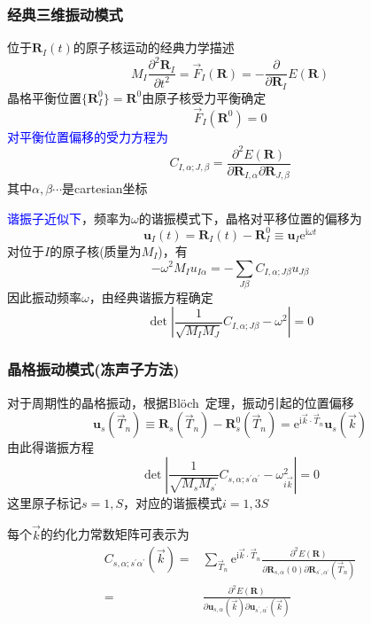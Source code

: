 \frame
{
	\frametitle{经典三维振动模式}
			位于$\mathbf{R}_I(t)$的原子核运动的经典力学描述
			\begin{displaymath}
				M_I\frac{\partial^2\mathbf{R}_I}{\partial t^2}=\vec F_I(\mathbf{R})=-\frac{\partial}{\partial\mathbf{R}_I}E(\mathbf{R})
			\end{displaymath}
			晶格平衡位置$\{\mathbf{R}_I^0\}=\mathbf R^0$由原子核受力平衡确定
			\begin{displaymath}
				\vec F_I(\mathbf R^0)=0
			\end{displaymath}
			\textcolor{blue}{对平衡位置偏移的受力方程为}
			\begin{displaymath}
				C_{I,\alpha;J,\beta}=\frac{\partial^2E(\mathbf{R})}{\partial\mathbf{R}_{I,\alpha}\partial\mathbf{R}_{J,\beta}}
			\end{displaymath}
			其中$\alpha,\beta\cdots$是\textrm{cartesian}坐标

			\textcolor{blue}{谐振子近似下}，频率为$\omega$的谐振模式下，晶格对平移位置的偏移为
			\begin{displaymath}
				\mathbf{u}_I(t)=\mathbf{R}_I(t)-\mathbf{R}_I^0\equiv\mathbf{u}_I\mathrm{e}^{\mathrm{i}\omega t}
			\end{displaymath}
			对位于$I$的原子核(质量为$M_I$)，有
			\begin{displaymath}
				-\omega^2M_Iu_{I\alpha}=-\sum_{J\beta}C_{I,\alpha;J\beta}u_{J\beta}
			\end{displaymath}
			因此振动频率$\omega$，由经典谐振方程确定
			\begin{displaymath}
				\det\left|\frac1{\sqrt{M_IM_J}}C_{I,\alpha;J\beta}-\omega^2\right|=0
			\end{displaymath}
}

\frame
{
	\frametitle{晶格振动模式(冻声子方法)}
	对于周期性的晶格振动，根据\textrm{Bl\"och~}定理，振动引起的位置偏移
			\begin{displaymath}
				\mathbf{u}_s(\vec T_n)\equiv\mathbf{R}_s(\vec T_n)-\mathbf{R}_s^0(\vec T_n)=\mathrm{e}^{\mathrm{i}\vec k\cdot\vec T_n}\mathbf{u}_s(\vec k)
			\end{displaymath}
			由此得谐振方程
			\begin{displaymath}
				\det\left|\frac1{\sqrt{M_sM_{s^{\prime}}}}C_{s,\alpha;s^{\prime}\alpha^{\prime}}-\omega_{i\vec k}^2\right|=0
			\end{displaymath}
			这里原子标记$s=1,S$，对应的谐振模式$i=1,3S$

			每个$\vec k$的约化力常数矩阵可表示为
			\begin{displaymath}
				\begin{aligned}
				C_{s,\alpha;s^{\prime}\alpha^{\prime}}(\vec k)=&\sum_{\vec T_n}\mathrm{e}^{\mathrm{i}\vec k\cdot\vec T_n}\frac{\partial^2 E(\mathbf{R})}{\partial\mathbf{R}_{s,\alpha}(0)\partial\mathbf{R}_{s^{\prime},\alpha^{\prime}}(\vec T_n)}\\
				=&\frac{\partial^2E(\mathbf{R})}{\partial\mathbf{u}_{s,\alpha}(\vec k)\partial\mathbf{u}_{s^{\prime},\alpha^{\prime}}(\vec k)} 
				\end{aligned}
			\end{displaymath}
}

